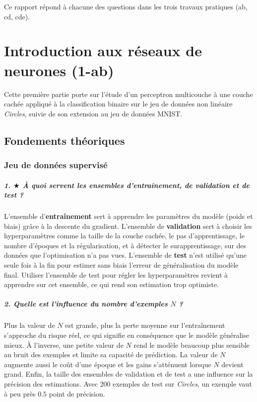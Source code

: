 \documentclass{report}
\begin{document}
\noindent
Ce rapport répond à chacune des questions dans les trois travaux pratiques (ab, cd, cde).

\chapter{Introduction aux réseaux de neurones (1-ab)}

Cette première partie porte sur l'étude d'un perceptron multicouche à une couche cachée appliqué à la classification binaire sur le jeu de données non linéaire \textit{Circles}, suivie de son extension au jeu de données MNIST.

\section{Fondements théoriques}
\subsection{Jeu de données supervisé}

\paragraph{1. $\bigstar$ À quoi servent les ensembles d'entraînement, de validation et de test ?}
L'ensemble d'\textbf{entraînement} sert à apprendre les paramètres du modèle (poids et biais) grâce à la descente du gradient. L'ensemble de \textbf{validation} sert à choisir les hyperparamètres comme la taille de la couche cachée, le pas d'apprentissage, le nombre d'époques et la régularisation, et à détecter le surapprentissage, sur des données que l'optimisation n'a pas vues. L'ensemble de \textbf{test} n'est utilisé qu'une seule fois à la fin pour estimer sans biais l'erreur de généralisation du modèle final. Utiliser l'ensemble de test pour régler les hyperparamètres revient à apprendre sur cet ensemble, ce qui rend son estimation trop optimiste.

\paragraph{2. Quelle est l'influence du nombre d'exemples $N$ ?}
Plus la valeur de $N$ est grande, plus la perte moyenne sur l'entraînement s'approche du risque réel, ce qui signifie en conséquence que le modèle généralise mieux. À l'inverse, une petite valeur de $N$ rend le modèle beaucoup plus sensible au bruit des exemples et limite sa capacité de prédiction. La valeur de $N$ augmente aussi le coût d'une époque et les gains s'atténuent lorsque $N$ devient grand. Enfin, la taille des ensembles de validation et de test a une influence sur la précision des estimations. Avec 200 exemples de test sur \textit{Circles}, un exemple vaut à peu près $0.5$ point de précision.
\end{document}
